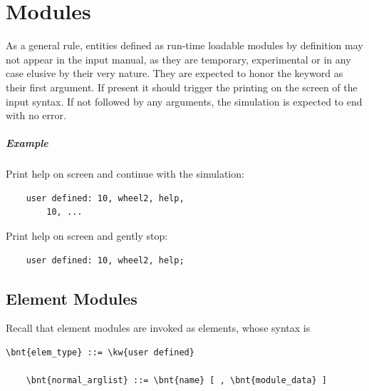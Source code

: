 %
%
%
%
%
% 
%
%

\chapter{Modules}

As a general rule, entities defined as run-time loadable modules by definition may not appear in the input manual, as they are temporary, experimental or in any case elusive by their very nature.
They are expected to honor the  keyword as their first argument.  If present it should trigger the printing on the screen of the input syntax.  If not followed by any arguments, the simulation is expected to end with no error.

\paragraph{Example}

\noindent
Print help on screen and continue with the simulation:
\begin{verbatim}
    user defined: 10, wheel2, help,
        10, ...
\end{verbatim}
Print help on screen and gently stop:
\begin{verbatim}
    user defined: 10, wheel2, help;
\end{verbatim}

\section{Element Modules}
Recall that element modules are invoked as  elements,
whose syntax is
\begin{Verbatim}[commandchars=\\\{\}]
    \bnt{elem_type} ::= \kw{user defined}

    \bnt{normal_arglist} ::= \bnt{name} [ , \bnt{module_data} ]
\end{Verbatim}


